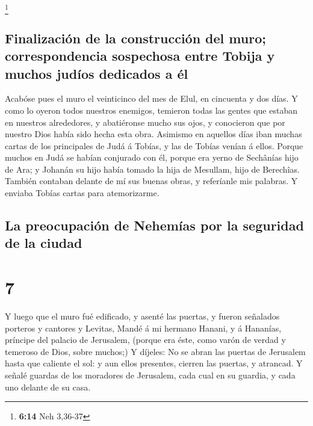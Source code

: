\footnote{\textbf{6:14} Neh 3,36-37}

\hypertarget{finalizaciuxf3n-de-la-construcciuxf3n-del-muro-correspondencia-sospechosa-entre-tobija-y-muchos-juduxedos-dedicados-a-uxe9l}{%
\subsection{Finalización de la construcción del muro; correspondencia
sospechosa entre Tobija y muchos judíos dedicados a
él}\label{finalizaciuxf3n-de-la-construcciuxf3n-del-muro-correspondencia-sospechosa-entre-tobija-y-muchos-juduxedos-dedicados-a-uxe9l}}

 Acabóse pues el muro el veinticinco del mes de Elul, en
cincuenta y dos días.  Y como lo oyeron todos nuestros
enemigos, temieron todas las gentes que estaban en nuestros alrededores,
y abatiéronse mucho sus ojos, y conocieron que por nuestro Dios había
sido hecha esta obra.  Asimismo en aquellos días iban
muchas cartas de los principales de Judá á Tobías, y las de Tobías
venían á ellos.  Porque muchos en Judá se habían conjurado
con él, porque era yerno de Sechânías hijo de Ara; y Johanán su hijo
había tomado la hija de Mesullam, hijo de Berechîas. 
También contaban delante de mí sus buenas obras, y referíanle mis
palabras. Y enviaba Tobías cartas para atemorizarme.

\hypertarget{la-preocupaciuxf3n-de-nehemuxedas-por-la-seguridad-de-la-ciudad}{%
\subsection{La preocupación de Nehemías por la seguridad de la
ciudad}\label{la-preocupaciuxf3n-de-nehemuxedas-por-la-seguridad-de-la-ciudad}}

\hypertarget{section-6}{%
\section{7}\label{section-6}}

 Y luego que el muro fué edificado, y asenté las puertas, y
fueron señalados porteros y cantores y Levitas,  Mandé á mi
hermano Hanani, y á Hananías, príncipe del palacio de Jerusalem, (porque
era éste, como varón de verdad y temeroso de Dios, sobre muchos;)
 Y díjeles: No se abran las puertas de Jerusalem hasta que
caliente el sol: y aun ellos presentes, cierren las puertas, y atrancad.
Y señalé guardas de los moradores de Jerusalem, cada cual en su guardia,
y cada uno delante de su casa.

